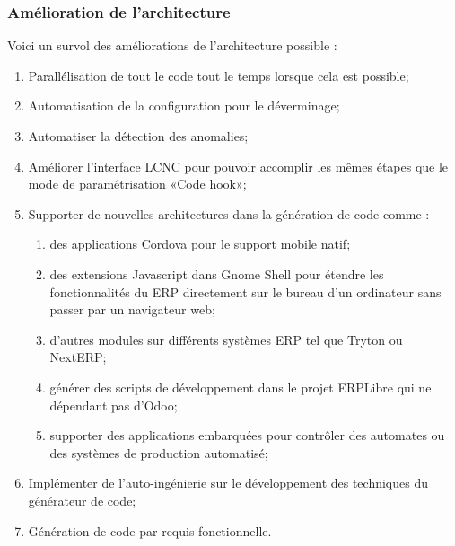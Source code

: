 \subsubsection{Amélioration de l’architecture}

Voici un survol des améliorations de l'architecture possible :

\begin{enumerate}
    \item Parallélisation de tout le code tout le temps lorsque cela est possible;
    \item Automatisation de la configuration pour le déverminage;
    \item Automatiser la détection des anomalies;
    \item Améliorer l’interface LCNC pour pouvoir accomplir les mêmes étapes que le mode de paramétrisation «Code hook»;
    \item Supporter de nouvelles architectures dans la génération de code comme :
        \begin{enumerate}
        \item des applications Cordova pour le support mobile natif;
        \item des extensions Javascript dans Gnome Shell pour étendre les fonctionnalités du ERP directement sur le bureau d’un ordinateur sans passer par un navigateur web;
        \item d'autres modules sur différents systèmes ERP tel que Tryton ou NextERP;
        \item générer des scripts de développement dans le projet ERPLibre qui ne dépendant pas d’Odoo;
        \item supporter des applications embarquées pour contrôler des automates ou des systèmes de production automatisé;
        \end{enumerate}
    \item Implémenter de l'auto-ingénierie sur le développement des techniques du générateur de code;
    \item Génération de code par requis fonctionnelle.
\end{enumerate}


